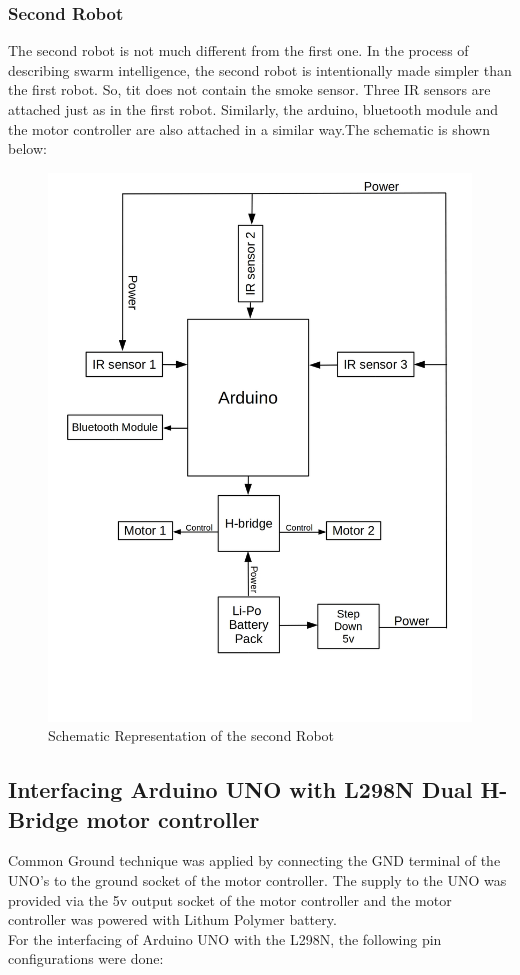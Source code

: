 \subsubsection{Second Robot}
The second robot is not much different from the first one. In the process of describing swarm intelligence, the second robot is intentionally made simpler than the first robot. So, tit does not contain the smoke sensor. Three IR sensors are attached just as in the first robot. Similarly, the arduino, bluetooth module and the motor controller are also attached in a similar way.The schematic is shown below:
\begin{figure}[h]
\center
\includegraphics[scale=0.25]{bot2new.jpg} 
\caption{Schematic Representation of the second Robot}
 \end{figure}
\subsection{Interfacing Arduino UNO with L298N Dual H-Bridge motor controller}
Common Ground technique was applied by connecting the GND terminal of the UNO's to the ground socket of the motor controller. The supply to the UNO was provided via the 5v output socket of the motor controller and the motor controller was powered with Lithum Polymer battery.\\
For the interfacing of Arduino UNO with the L298N, the following pin configurations were done:
 
